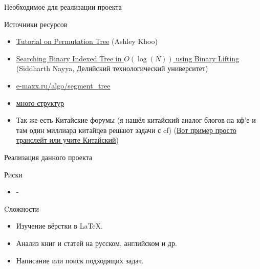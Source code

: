 \documentclass[8pt]{beamer}%
\begin{document}
\begin{frame}{Необходимое для реализации проекта}
\begin{block}{Источники ресурсов}
\begin{itemize}
				\item \href{https://codeforces.com/blog/entry/78898}{Tutorial on Permutation Tree} (Ashley Khoo)
				
				\item \href{https://codeforces.com/blog/entry/61364}{Searching Binary Indexed Tree in $O( \log(N))$ using Binary Lifting} (Siddharth Nayya, Делийский технологический университет)
				
				\item \href{https://e-maxx.ru/algo/segment_tree}{e-maxx.ru/algo/segment\_tree}
				
				\item \href{https://codeforces.com/blog/entry/15729}{много структур}
				
				\item Так же есть Китайские форумы (я нашёл китайский аналог блогов на кф'е и там один миллиард китайцев решают задачи с cf) (\href{https://blog.csdn.net/weixin_43826249/article/details/102600666}{Вот пример просто транслейт или учите Китайский})
				
			\end{itemize}
		\end{block}
		
		
	\end{frame}





	\begin{frame}{Реализация данного проекта}
		\begin{block}{Риски}
			\begin{itemize}
				\item -
			\end{itemize}
		\end{block}
		
		\begin{block}{Cложности}
			\begin{itemize}
				\item Изучение вёрстки в \LaTeX.
				\item Анализ книг и статей на русском, английском и др.
				\item Написание или поиск подходящих задач.
			\end{itemize}
		\end{block}
	\end{frame}
\end{document}
